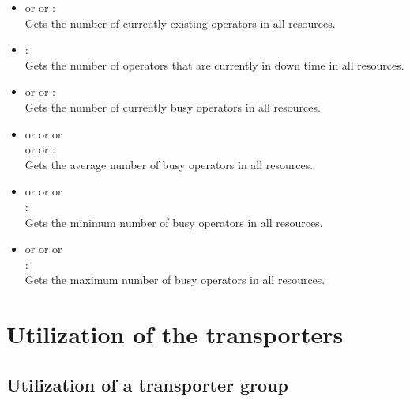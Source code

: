 \begin{itemize}

\item
{} or  or :\\
Gets the number of currently existing operators in all resources.

\item
{}:\\
Gets the number of operators that are currently in down time in all resources.

\item
{} or  or :\\
Gets the number of currently busy operators in all resources.

\item
{} or  or  or\\
 or  or :\\
Gets the average number of busy operators in all resources.

\item
{} or  or  or\\
:\\
Gets the minimum number of busy operators in all resources.

\item
{} or  or  or\\
:\\
Gets the maximum number of busy operators in all resources.

\end{itemize}  



\section{Utilization of the transporters}



\subsection{Utilization of a transporter group}

